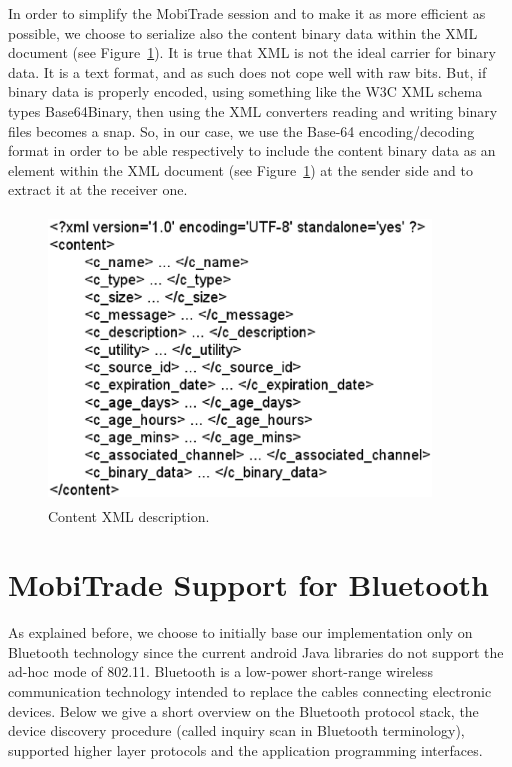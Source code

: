 In order to simplify the MobiTrade session and to make it as more efficient as possible, we choose to serialize also the content binary data within the XML document (see Figure~\ref{contentxml}). It is true that XML is not the ideal carrier for binary data. It is a text format, and as such does not cope well with raw bits. But, if binary data is properly encoded, using something like the W3C XML schema types Base64Binary, then using the XML converters reading and writing binary files becomes a snap. So, in our case, we use the Base-64 encoding/decoding format in order to be able respectively to include the content binary data as an element within the XML document (see Figure~\ref{contentxml}) at the sender side and to extract it at the receiver one.  

\begin{figure}[!h]
\begin{center}
\includegraphics[width=4in,height=3in]{Chapitre6/contentxml.eps}
\end{center}
\caption{Content XML description.}
\label{contentxml}
\end{figure}

\section{MobiTrade Support for Bluetooth}
\label{MobiTradeDesignAndImplementation}

As explained before, we choose to initially base our implementation only on Bluetooth technology since the current android Java libraries do not support the ad-hoc mode of 802.11. Bluetooth is a low-power short-range wireless communication technology intended to replace the cables connecting electronic devices. Below we give a short overview on the Bluetooth protocol stack, the device discovery procedure (called inquiry scan in Bluetooth terminology), supported higher layer protocols and the application programming interfaces.

